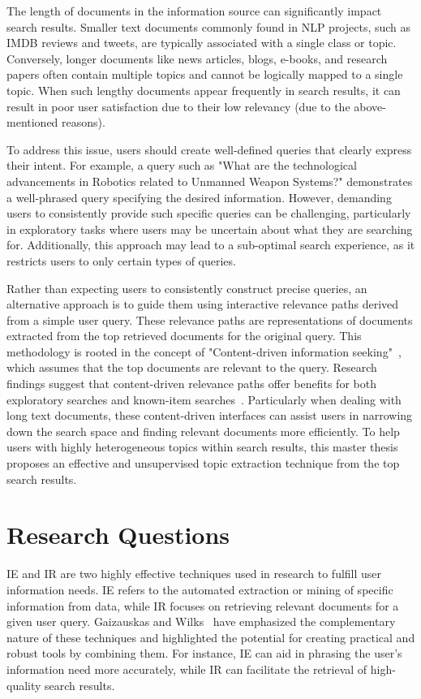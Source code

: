 The length of documents in the information source can significantly impact search results. Smaller text documents commonly found in \ac{NLP} projects, such as IMDB reviews and tweets, are typically associated with a single class or topic. Conversely, longer documents like news articles, blogs, e-books, and research papers often contain multiple topics and cannot be logically mapped to a single topic. When such lengthy documents appear frequently in search results, it can result in poor user satisfaction due to their low relevancy (due to the above-mentioned reasons).


To address this issue, users should create well-defined queries that clearly express their intent. For example, a query such as "What are the technological advancements in Robotics related to Unmanned Weapon Systems?" demonstrates a well-phrased query specifying the desired information. However, demanding users to consistently provide such specific queries can be challenging, particularly in exploratory tasks where users may be uncertain about what they are searching for. Additionally, this approach may lead to a sub-optimal search experience, as it restricts users to only certain types of queries.

Rather than expecting users to consistently construct precise queries, an alternative approach is to guide them using interactive relevance paths derived from a simple user query. These relevance paths are representations of documents extracted from the top retrieved documents for the original query. This methodology is rooted in the concept of "Content-driven information seeking"~\cite{marchionini2007find}, which assumes that the top documents are relevant to the query. Research findings suggest that content-driven relevance paths offer benefits for both exploratory searches and known-item searches~\cite{marchionini2007find}. Particularly when dealing with long text documents, these content-driven interfaces can assist users in narrowing down the search space and finding relevant documents more efficiently. To help users with highly heterogeneous topics within search results, this master thesis proposes an effective and unsupervised topic extraction technique from the top search results.
 
\section{Research Questions}

\ac{IE} and \ac{IR} are two highly effective techniques used in research to fulfill user information needs. \ac{IE} refers to the automated extraction or mining of specific information from data, while IR focuses on retrieving relevant documents for a given user query. Gaizauskas and Wilks~\cite{gaizauskas1998information} have emphasized the complementary nature of these techniques and highlighted the potential for creating practical and robust tools by combining them. For instance, \ac{IE} can aid in phrasing the user's information need more accurately, while IR can facilitate the retrieval of high-quality search results.
 
